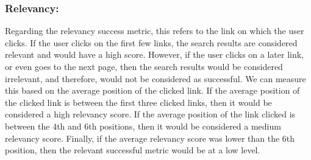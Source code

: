 \smallskip

\subsubsection*{Relevancy:}
Regarding the relevancy success metric, this refers to the link on which the user 
clicks. If the user clicks on the first few links, the search results are 
considered relevant and would have a high score. However, if the user clicks on a 
later link, or even goes to the next page, then the search results would be 
considered irrelevant, and therefore, would not be considered as successful. We 
can measure this based on the average position of the clicked link. If the average 
position of the clicked link is between the first three clicked links, then it 
would be considered a high relevancy score. If the average position of the link 
clicked is between the 4th and 6th positions, then it would be considered a medium 
relevancy score. Finally, if the average relevancy score was lower than the 6th 
position, then the relevant successful metric would be at a low level.

